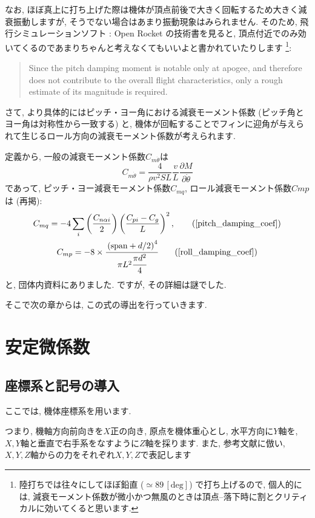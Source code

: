 \documentclass[uplatex,dvipdfmx,a4j,11  pt]{jsarticle}
\begin{document}
なお, ほぼ真上に打ち上げた際は機体が頂点前後で大きく回転するため大きく減衰振動しますが, そうでない場合はあまり振動現象はみられません.
そのため, 飛行シミュレーションソフト : Open Rocket の技術書\cite{openrocket}を見ると, 頂点付近でのみ効いてくるのであまりちゃんと考えなくてもいいよと書かれていたりします
\footnote{陸打ちでは往々にしてほぼ鉛直 ($\simeq 89\,\mathrm{[deg]}$) で打ち上げるので, 個人的には, 減衰モーメント係数が微小かつ無風のときは頂点--落下時に割とクリティカルに効いてくると思います.}:
\begin{quote}
  Since the pitch damping moment is notable only at apogee, and therefore does
not contribute to the overall flight characteristics, only a rough estimate of its
magnitude is required.
\end{quote}

\enskip

さて, より具体的にはピッチ・ヨー角における減衰モーメント係数 (ピッチ角とヨー角は対称性から一致する) と, 機体が回転することでフィンに迎角が与えられて生じるロール方向の減衰モーメント係数が考えられます.

定義から, 一般の減衰モーメント係数$C_{m\dot{\theta}}$は
\begin{equation}
  C_{m\dot{\theta}} = \frac{4}{\rho v^2 S L}\frac{v}{L}\frac{\partial M}{\partial\dot{\theta}} \label{fte_def}
\end{equation}
であって, ピッチ・ヨー減衰モーメント係数$C_{mq}$, ロール減衰モーメント係数$C{mp}$は (再掲):
\begin{gather*}
  C_{mq} = - 4 \sum_i \left(\frac{C_{n\alpha i}}{2}\right)\left(\frac{C_{pi} - C_{g}}{L}\right)^2,\tag{\ref{pitch_damping_coef}}\\
  C_{mp} = - 8 \times \cfrac{\left(\mathrm{span} + d/2\right)^4}{\pi L^2 \cfrac{\pi d^2}{4}} \tag{\ref{roll_damping_coef}}
\end{gather*}
と, 団体内資料にありました. ですが, その詳細は謎でした. 

そこで次の章からは, この式の導出を行っていきます.

\section{安定微係数}
\subsection{座標系と記号の導入}
ここでは, 機体座標系を用います.

つまり, 機軸方向前向きを$X$正の向き, 原点を機体重心とし, 水平方向に$Y$軸を, $X, Y$軸と垂直で右手系をなすように$Z$軸を採ります.
また, 参考文献\cite{aerodynamics}に倣い, $X, Y, Z$軸からの力をそれぞれ$X, Y, Z$で表記します
\end{document}
